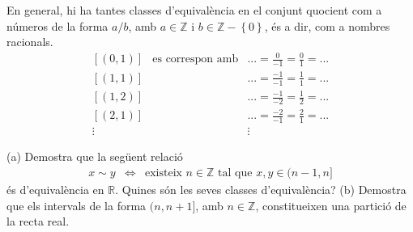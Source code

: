 \begin{solucio}
En general, hi ha tantes classes d'equival\`{e}ncia en el conjunt quocient
com a n\'{u}meros de la forma $a/b$, amb $a\in \mathbb{Z}$ i $b\in \mathbb{Z}%
-\left\{ 0\right\} $, \'{e}s a dir, com a nombres racionals.%
\begin{equation*}
\begin{array}{ccc}
\left[ (0,1)\right] & \text{es correspon amb} & ...=\frac{0}{-1}=\frac{0}{1}%
=... \\
\left[ (1,1)\right] &  & ...=\frac{-1}{-1}=\frac{1}{1}=... \\
\left[ (1,2)\right] &  & ...=\frac{-1}{-2}=\frac{1}{2}=... \\
\left[ (2,1)\right] &  & ...=\frac{-2}{-1}=\frac{2}{1}=... \\
\vdots &  & \vdots%
\end{array}%
\end{equation*}
\end{solucio}

\begin{exercici}
(a) Demostra que la seg\"{u}ent relaci\'{o}%
\begin{equation*}
\begin{array}{ccc}
x\sim y & \Longleftrightarrow & \text{existeix }n\in \mathbb{Z}\text{ \ tal
que }x,y\in (n-1,n]%
\end{array}%
\end{equation*}%
\'{e}s d'equival\`{e}ncia en $\mathbb{R}$. Quines s\'{o}n les seves classes
d'equival\`{e}ncia? (b) Demostra que els intervals de la forma $(n,n+1]$,
amb $n\in \mathbb{Z}$, constitueixen una partici\'{o} de la recta real.
\end{exercici}

